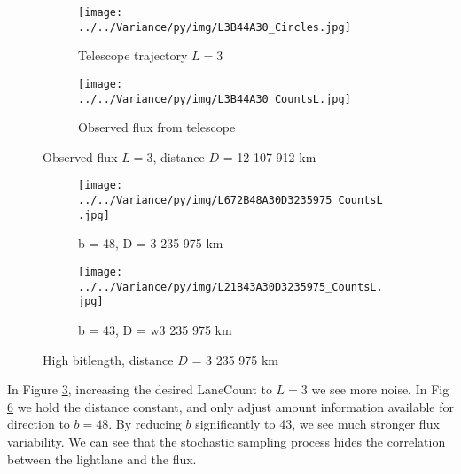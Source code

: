 \documentclass[notitlepage]{article}
\begin{document}
\begin{figure}
\centering

 \begin{subfigure}[t]{0.45\textwidth}
       
{\texttt{[image: ../../Variance/py/img/L3B44A30\_Circles.jpg]}}

\caption{Telescope trajectory $L =3$}
\label{fig:telescopeTrajectoryL3A}
 \end{subfigure}
 \begin{subfigure}[t]{0.5\textwidth}
{\texttt{[image: ../../Variance/py/img/L3B44A30\_CountsL.jpg]}}
\caption{Observed flux from telescope}
\label{fig:observedFluxL3B}
\end{subfigure}
\caption{Observed flux $L=3$, distance $D$ = 12 107 912 km}
\label{fig:observedFluxL3}
\end{figure}



\begin{figure}
\centering

 \begin{subfigure}[t]{0.45\textwidth}
       
{\texttt{[image: ../../Variance/py/img/L672B48A30D3235975\_CountsL.jpg]}}

\caption{b = 48, D = 3 235 975 km }
\label{fig:telescopeTrajectory}
 \end{subfigure}
 \begin{subfigure}[t]{0.5\textwidth}
{\texttt{[image: ../../Variance/py/img/L21B43A30D3235975\_CountsL.jpg]}}
\caption{b = 43, D = w3 235 975 km }
\label{fig:observedFlux}
\end{subfigure}
\caption{High bitlength, distance $D$ = 3 235 975 km}
\label{fig:observedFluxHigh}
\end{figure}

In Figure \ref{fig:observedFluxL3}, increasing the desired LaneCount to $L = 3$ we see more noise. In Fig \ref{fig:observedFluxHigh} we hold the distance constant, and only adjust amount information available for direction to $b = 48$. By reducing $b$ significantly to 43, we see much stronger flux variability. We can see that the stochastic sampling process hides the correlation between the lightlane and the flux. 
\end{document}
